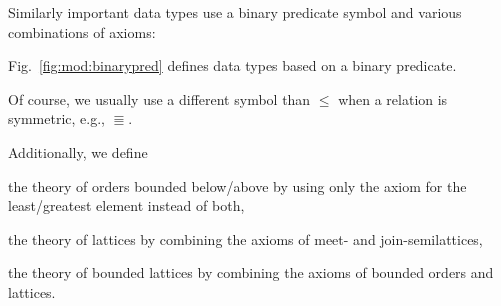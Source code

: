 Similarly important data types use a binary predicate symbol and various combinations of axioms:

\begin{example}\label{ex:mod:binarypred}
Fig.~\ref{fig:mod:binarypred} defines data types based on a binary predicate.

Of course, we usually use a different symbol than $\leq$ when a relation is symmetric, e.g., $\Equiv$.

Additionally, we define
\begin{compactitem}
\item the theory of orders bounded below/above by using only the axiom for the least/greatest element instead of both,
\item the theory of lattices by combining the axioms of meet- and join-semilattices,
\item the theory of bounded lattices by combining the axioms of bounded orders and lattices.
\end{compactitem}
\end{example}

